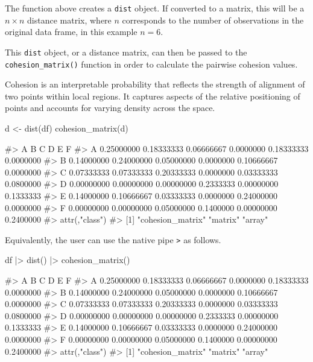 The function above creates a \texttt{dist} object. If converted to a
matrix, this will be a \(n\times n\) distance matrix, where \(n\)
corresponds to the number of observations in the original data frame, in
this example \(n = 6\).

This \texttt{dist} object, or a distance matrix, can then be passed to
the \texttt{cohesion\_matrix()} function in order to calculate the
pairwise cohesion values.

Cohesion is an interpretable probability that reflects the strength of
alignment of two points within local regions. It captures aspects of the
relative positioning of points and accounts for varying density across
the space.

\begin{Schunk}
\begin{Sinput}
d <- dist(df)
cohesion_matrix(d)
\end{Sinput}
\begin{Soutput}
#>            A          B          C         D          E         F
#> A 0.25000000 0.18333333 0.06666667 0.0000000 0.18333333 0.0000000
#> B 0.14000000 0.24000000 0.05000000 0.0000000 0.10666667 0.0000000
#> C 0.07333333 0.07333333 0.20333333 0.0000000 0.03333333 0.0800000
#> D 0.00000000 0.00000000 0.00000000 0.2333333 0.00000000 0.1333333
#> E 0.14000000 0.10666667 0.03333333 0.0000000 0.24000000 0.0000000
#> F 0.00000000 0.00000000 0.05000000 0.1400000 0.00000000 0.2400000
#> attr(,"class")
#> [1] "cohesion_matrix" "matrix"          "array"
\end{Soutput}
\end{Schunk}

Equivalently, the user can use the native pipe
\texttt{\textbar{}\textgreater{}} as follows.

\begin{Schunk}
\begin{Sinput}
df |>
  dist() |>
  cohesion_matrix()
\end{Sinput}
\begin{Soutput}
#>            A          B          C         D          E         F
#> A 0.25000000 0.18333333 0.06666667 0.0000000 0.18333333 0.0000000
#> B 0.14000000 0.24000000 0.05000000 0.0000000 0.10666667 0.0000000
#> C 0.07333333 0.07333333 0.20333333 0.0000000 0.03333333 0.0800000
#> D 0.00000000 0.00000000 0.00000000 0.2333333 0.00000000 0.1333333
#> E 0.14000000 0.10666667 0.03333333 0.0000000 0.24000000 0.0000000
#> F 0.00000000 0.00000000 0.05000000 0.1400000 0.00000000 0.2400000
#> attr(,"class")
#> [1] "cohesion_matrix" "matrix"          "array"
\end{Soutput}
\end{Schunk}

